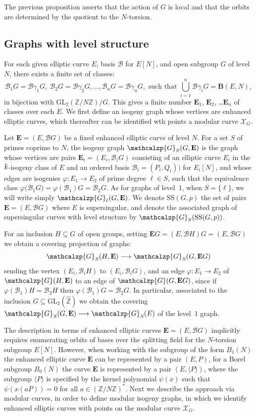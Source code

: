 \documentclass{amsart}
\newcommand{\cB}{\mathcal{B}}
\newcommand{\BB}{\mathbf{B}}
\newcommand{\EE}{\mathbf{E}}
\newcommand{\ZZ}{\mathbb{Z}}
\newcommand{\ZZhat}{\widehat{\ZZ}}
\newcommand{\XC}{\mathcal{X}}
\newcommand{\GL}{\mathrm{GL}}
\renewcommand{\SS}{\mathrm{SS}}
\newcommand{\overbar}[1]{\mkern 2.0mu\overline{\mkern-2.0mu#1\mkern-2.0mu}\mkern 2.0mu}
\newcommand{\kbar}{\overbar{\smash{k}\vphantom{t}}}
\newcommand{\Graph}{\mathcalzp{G}}
\newcommand{\Group}{G}
\renewcommand{\SS}{\mathrm{SS}}
\begin{document}
\smallskip
{}
The previous proposition asserts that the action of $G$ is local and that the orbits are
determined by the quotient to the $N$-torsion.

\subsection*{Graphs with level structure}
For each given elliptic curve $E$, basis $\cB$ for $E[N]$, and open subgroup $G$
of level $N$, there exists a finite set of classes:
$$
\cB_1 G = \cB\gamma_1G,\
\cB_2 G = \cB\gamma_2G, \dots,
\cB_n G = \cB\gamma_nG, \mbox{ such that } \bigcup_{i=1}^n \cB \gamma_i G = \BB(E,N),
$$
in bijection with $\GL_2(\ZZ/N\ZZ)/G$. This gives a finite number $\EE_1$, $\EE_2$,
\dots $\EE_n$ of classes over each $E$.  We first define an isogeny graph whose
vertices are enhanced elliptic curves, which thereafter can be identified wth points
a modular curve $\XC_G$.

Let $\EE = (E,\cB\Group)$ be a fixed enhanced elliptic curve of level $N$.
For a set $S$ of primes coprime to $N$, the isogeny graph $\Graph_S(\Group,\EE)$
is the graph whose vertices are pairs
$\EE_i = (E_i,\cB_i\Group)$ consisting of an elliptic curve
$E_i$ in the $\kbar$-isogeny class of $E$ and an ordered
basis $\cB_i = (P_i,Q_i))$ for $E_i[N]$, and whose edges are
isogenies $\varphi: E_1 \longrightarrow E_2$ of prime degree $\ell \in S$,
such that the equivalence class
$\varphi\big(\cB_1\Group\big) = \varphi(\cB_1)\Group = \cB_2\Group$.
As for graphs of level~$1$, when $S = \{\ell\}$, we will write simply
$\Graph_\ell(\Group,\EE)$.
We denote $\SS(\Group,p)$ the set of pairs $\EE = (E,\cB\Group)$
where $E$ is supersingular, and denote the associated graph of supersingular curves
with level structure by $\Graph_S(\SS(\Group,p))$.

For an inclusion $H \subseteq \Group$ of open groups, setting
$\EE{G}  = (E,\cB{H})G = (E,\cB{G})$ we obtain a covering projection of graphs:
$$
\Graph_S(H,\EE) \longrightarrow \Graph_S(\Group,\EE{G})
$$
sending the vertex $(E_i,\cB_i H)$ to $(E_i,\cB_i\Group)$, and
an edge $\varphi: E_1 \longrightarrow E_2$ of $\Graph(H,\EE)$ to an edge
of $\Graph(\Group,\EE{G})$, since if $\varphi(\cB_1)H = \cB_2H$ then
$\varphi(\cB_1)\Group =  \cB_2\Group$.
In particular, associated to the inclusion $\Group \subseteq \GL_2(\ZZhat)$
we obtain the covering $\Graph_S(\Group,\EE) \longrightarrow \Graph_S(E)$
of the level~$1$ graph.

The description in terms of enhanced elliptic curves $\EE = (E,\cB{G})$ implicitly
requires enumerating orbits of bases over the splitting field for the $N$-torsion
subgroup $E[N]$.  However, when working with the subgroup of the form $B_1(N)$
the enhanced elliptic curve $\EE$ can be represented by a pair $(E,P)$, for
a Borel subgroup $B_0(N)$ the curve $\EE$ is represented by a pair
$(E,\langle{P}\rangle)$, where the subgroup $\langle{P}\rangle$ is specified by
the kernel polynomial $\psi(x)$ such that $\psi(x(aP)) = 0$ for all $a \in (\ZZ/N\ZZ)^*$.
Next we describe the approach via modular curves, in order to define
modular isogeny graphs, in which we identify enhanced elliptic curves with
points on the modular curve $\XC_G$.
\end{document}
